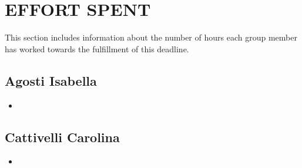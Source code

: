 \section{EFFORT  SPENT}  
This section  includes  information  about  the  number  of  hours  each group member has worked towards the fulfillment of this deadline. 
\subsection{Agosti Isabella}
\begin{itemize}
	\item 
\end{itemize}
\subsection{Cattivelli Carolina}
\begin{itemize}
	\item 
\end{itemize}